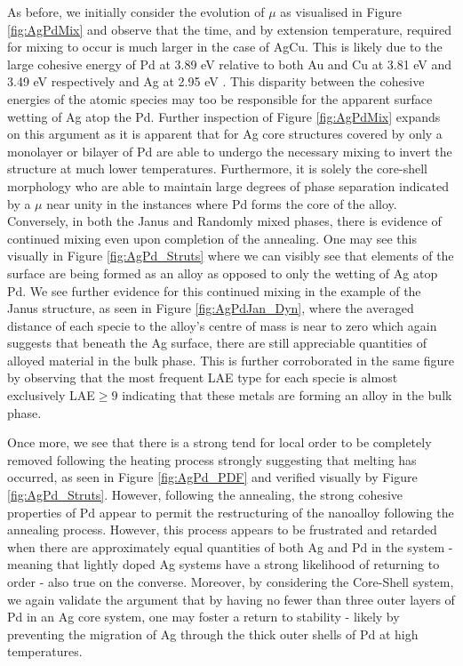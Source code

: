 As before, we initially consider the evolution of $\mu$ as visualised in Figure \ref{fig:AgPdMix} and observe that the time, and by extension temperature, required for mixing to occur is much larger in the case of AgCu. This is likely due to the large cohesive energy of Pd at 3.89 eV relative to both Au and Cu at 3.81 eV and 3.49 eV respectively and Ag at 2.95 eV \cite{kittel_1964}. This disparity between the cohesive energies of the atomic species may too be responsible for the apparent surface wetting of Ag atop the Pd. Further inspection of Figure \ref{fig:AgPdMix} expands on this argument as it is apparent that for Ag core structures covered by only a monolayer or bilayer of Pd are able to undergo the necessary mixing to invert the structure at much lower temperatures. Furthermore, it is solely the core-shell morphology who are able to maintain large degrees of phase separation indicated by a $\mu$ near unity in the instances where Pd forms the core of the alloy. Conversely, in both the Janus and Randomly mixed phases, there is evidence of continued mixing even upon completion of the annealing. One may see this visually in Figure \ref{fig:AgPd_Struts} where we can visibly see that elements of the surface are being formed as an alloy as opposed to only the wetting of Ag atop Pd. We see further evidence for this continued mixing in the example of the Janus structure, as seen in Figure \ref{fig:AgPdJan_Dyn}, where the averaged distance of each specie to the alloy's centre of mass is near to zero which again suggests that beneath the Ag surface, there are still appreciable quantities of alloyed material in the bulk phase. This is further corroborated in the same figure by observing that the most frequent LAE type for each specie is almost exclusively LAE$\geq9$ indicating that these metals are forming an alloy in the bulk phase.

Once more, we see that there is a strong tend for local order to be completely removed following the heating process strongly suggesting that melting has occurred, as seen in Figure \ref{fig:AgPd_PDF} and verified visually by Figure \ref{fig:AgPd_Struts}. However, following the annealing, the strong cohesive properties of Pd appear to permit the restructuring of the nanoalloy following the annealing process. However, this process appears to be frustrated and retarded when there are approximately equal quantities of both Ag and Pd in the system - meaning that lightly doped Ag systems have a strong likelihood of returning to order - also true on the converse. Moreover, by considering the Core-Shell system, we again validate the argument that by having no fewer than three outer layers of Pd in an Ag core system, one may foster a return to stability - likely by preventing the migration of Ag through the thick outer shells of Pd at high temperatures.

